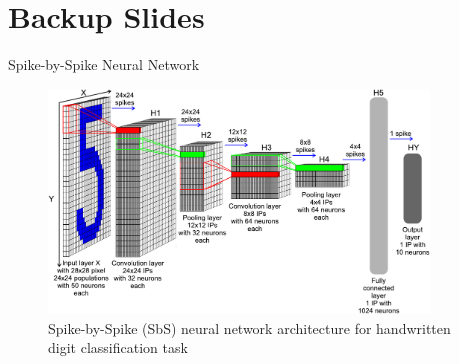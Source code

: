 \section*{Backup Slides}
\backupbegin
\begin{frame}{Spike-by-Spike Neural Network}

			\begin{figure}
				\includegraphics[width=0.9\textwidth]{../chapters/sbs_accelerator/figures/sbs_network.pdf} %
				\caption{Spike-by-Spike (SbS) neural network architecture for handwritten digit classification task}
			\end{figure}

\end{frame}

